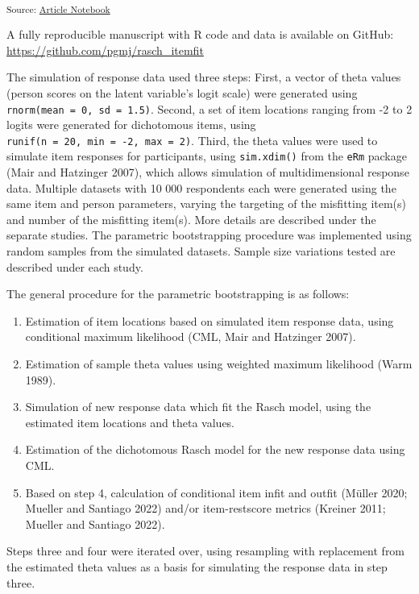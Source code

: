 \documentclass[
  letterpaper,
  DIV=11,
  numbers=noendperiod]{scrartcl}
\providecommand{\tightlist}{%
  \setlength{\itemsep}{0pt}\setlength{\parskip}{0pt}}\usepackage{longtable,booktabs,array}
\begin{document}
\textsubscript{Source:
\href{https://pgmj.github.io/rasch_itemfit/index.qmd.html}{Article
Notebook}}

A fully reproducible manuscript with R code and data is available on
GitHub: \url{https://github.com/pgmj/rasch_itemfit}

The simulation of response data used three steps: First, a vector of
theta values (person scores on the latent variable's logit scale) were
generated using \texttt{rnorm(mean\ =\ 0,\ sd\ =\ 1.5)}. Second, a set
of item locations ranging from -2 to 2 logits were generated for
dichotomous items, using
\texttt{runif(n\ =\ 20,\ min\ =\ -2,\ max\ =\ 2)}. Third, the theta
values were used to simulate item responses for participants, using
\texttt{sim.xdim()} from the \texttt{eRm} package (Mair and Hatzinger
2007), which allows simulation of multidimensional response data.
Multiple datasets with 10 000 respondents each were generated using the
same item and person parameters, varying the targeting of the misfitting
item(s) and number of the misfitting item(s). More details are described
under the separate studies. The parametric bootstrapping procedure was
implemented using random samples from the simulated datasets. Sample
size variations tested are described under each study.

The general procedure for the parametric bootstrapping is as follows:

\begin{enumerate}
\def\labelenumi{\arabic{enumi}.}
\tightlist
\item
  Estimation of item locations based on simulated item response data,
  using conditional maximum likelihood (CML, Mair and Hatzinger 2007).
\item
  Estimation of sample theta values using weighted maximum likelihood
  (Warm 1989).
\item
  Simulation of new response data which fit the Rasch model, using the
  estimated item locations and theta values.
\item
  Estimation of the dichotomous Rasch model for the new response data
  using CML.
\item
  Based on step 4, calculation of conditional item infit and outfit
  (Müller 2020; Mueller and Santiago 2022) and/or item-restscore metrics
  (Kreiner 2011; Mueller and Santiago 2022).
\end{enumerate}

Steps three and four were iterated over, using resampling with
replacement from the estimated theta values as a basis for simulating
the response data in step three.
\end{document}
